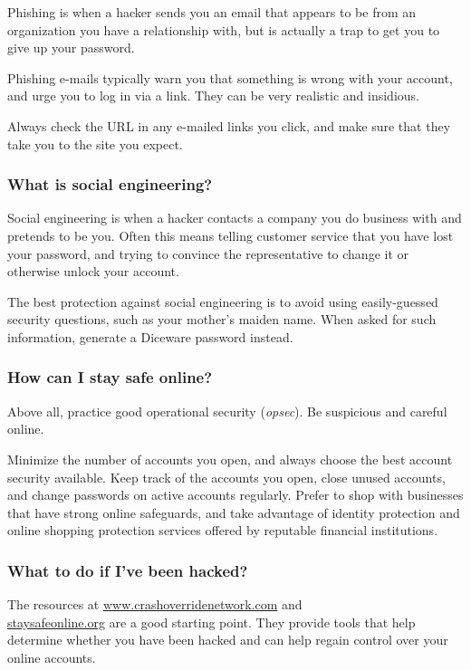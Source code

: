 Phishing is when a hacker sends you an email that appears to be from an organization you have a relationship with, but is actually a trap to get you to give up your password.

Phishing e-mails typically warn you that something is wrong with your account, and urge you to log in via a link. They can be very realistic and insidious.

Always check the URL in any e-mailed links you click, and make sure that they take you to the site you expect.

\subsubsection{What is social engineering?}

Social engineering is when a hacker contacts a company you do business with and pretends to be you. Often this means telling customer service that you have lost your password, and trying to convince the representative to change it or otherwise unlock your account.

The best protection against social engineering is to avoid using easily-guessed security questions, such as your mother's maiden name. When asked for such information, generate a Diceware password instead.

\subsubsection{How can I stay safe online?}

Above all, practice good operational security (\textit{opsec}). Be suspicious and careful online. 

Minimize the number of accounts you open, and always choose the best account security available. Keep track of the accounts you open, close unused accounts, and change passwords on active accounts regularly. Prefer to shop with businesses that have strong online safeguards, and take advantage of identity protection and online shopping protection services offered by reputable financial institutions.

\subsubsection{What to do if I've been hacked?}

The resources at \url{www.crashoverridenetwork.com} and \\  \url{staysafeonline.org} are a good starting point. They provide tools that help determine whether you have been hacked and can help regain control over your online accounts.
